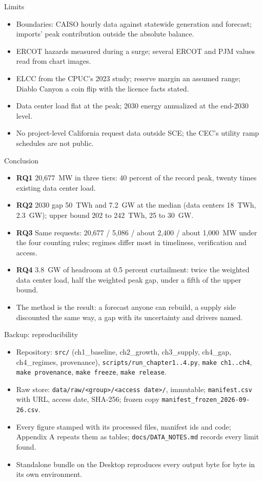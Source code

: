 \documentclass[aspectratio=169,10pt]{beamer}
\begin{document}
\begin{frame}{Limits}
\begin{itemize}
\item Boundaries: CAISO hourly data against statewide generation and forecast; imports' peak contribution outside the absolute balance.
\item ERCOT hazards measured during a surge; several ERCOT and PJM values read from chart images.
\item ELCC from the CPUC's 2023 study; reserve margin an assumed range; Diablo Canyon a coin flip with the licence facts stated.
\item Data center load flat at the peak; 2030 energy annualized at the end-2030 level.
\item No project-level California request data outside SCE; the CEC's utility ramp schedules are not public.
\end{itemize}
\end{frame}

\begin{frame}{Conclusion}
\begin{itemize}
\item \textbf{RQ1} 20,677~MW in three tiers: 40 percent of the record peak, twenty times existing data center load.
\item \textbf{RQ2} 2030 gap 50~TWh and 7.2~GW at the median (data centers 18~TWh, 2.3~GW); upper bound 202 to 242~TWh, 25 to 30~GW.
\item \textbf{RQ3} Same requests: 20,677 / 5,086 / about 2,400 / about 1,000~MW under the four counting rules; regimes differ most in timeliness, verification and access.
\item \textbf{RQ4} 3.8~GW of headroom at 0.5 percent curtailment: twice the weighted data center load, half the weighted peak gap, under a fifth of the upper bound.
\item The method is the result: a forecast anyone can rebuild, a supply side discounted the same way, a gap with its uncertainty and drivers named.
\end{itemize}
\end{frame}

\begin{frame}{Backup: reproducibility}
\begin{itemize}\small
\item Repository: \texttt{src/} (ch1\_baseline, ch2\_growth, ch3\_supply, ch4\_gap, ch4\_regimes, provenance), \texttt{scripts/run\_chapter1..4.py}, \texttt{make ch1..ch4}, \texttt{make provenance}, \texttt{make freeze}, \texttt{make release}.
\item Raw store: \texttt{data/raw/<group>/<access date>/}, immutable; \texttt{manifest.csv} with URL, access date, SHA-256; frozen copy \texttt{manifest\_frozen\_2026-09-26.csv}.
\item Every figure stamped with its processed files, manifest ids and code; Appendix A repeats them as tables; \texttt{docs/DATA\_NOTES.md} records every limit found.
\item Standalone bundle on the Desktop reproduces every output byte for byte in its own environment.
\end{itemize}
\end{frame}
\end{document}
